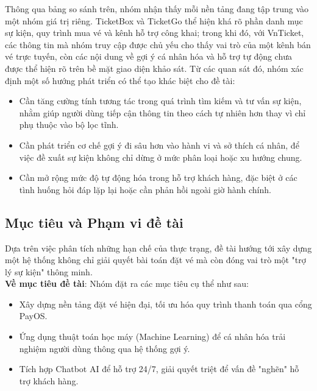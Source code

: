 Thông qua bảng so sánh trên, nhóm nhận thấy mỗi nền tảng đang tập trung vào một nhóm giá trị riêng. TicketBox và TicketGo thể hiện khá rõ phần danh mục sự kiện, quy trình mua vé và kênh hỗ trợ công khai; trong khi đó, với VnTicket, các thông tin mà nhóm truy cập được chủ yếu cho thấy vai trò của một kênh bán vé trực tuyến, còn các nội dung về gợi ý cá nhân hóa và hỗ trợ tự động chưa được thể hiện rõ trên bề mặt giao diện khảo sát.
Từ các quan sát đó, nhóm xác định một số hướng phát triển có thể tạo khác biệt cho đề tài:
\begin{itemize}
    \item[1.] Cần tăng cường tính tương tác trong quá trình tìm kiếm và tư vấn sự kiện, nhằm giúp người dùng tiếp cận thông tin theo cách tự nhiên hơn thay vì chỉ phụ thuộc vào bộ lọc tĩnh.
    \item[2.] Cần phát triển cơ chế gợi ý đi sâu hơn vào hành vi và sở thích cá nhân, để việc đề xuất sự kiện không chỉ dừng ở mức phân loại hoặc xu hướng chung.
    \item[3.] Cần mở rộng mức độ tự động hóa trong hỗ trợ khách hàng, đặc biệt ở các tình huống hỏi đáp lặp lại hoặc cần phản hồi ngoài giờ hành chính.
\end{itemize}

\subsection{Mục tiêu và Phạm vi đề tài}
\indent \indent Dựa trên việc phân tích những hạn chế của thực trạng, đề tài hướng tới xây dựng một hệ thống không chỉ giải quyết bài toán đặt vé mà còn đóng vai trò một "trợ lý sự kiện" thông minh.\\
\indent \textbf{Về mục tiêu đề tài}: Nhóm đặt ra các mục tiêu cụ thể như sau:
\begin{itemize}
\item[1.] Xây dựng nền tảng đặt vé hiện đại, tối ưu hóa quy trình thanh toán qua cổng PayOS.
\item[2.] Ứng dụng thuật toán học máy (Machine Learning) để cá nhân hóa trải nghiệm người dùng thông qua hệ thống gợi ý.
\item[3.] Tích hợp Chatbot AI để hỗ trợ 24/7, giải quyết triệt để vấn đề "nghẽn" hỗ trợ khách hàng.
\end{itemize}

